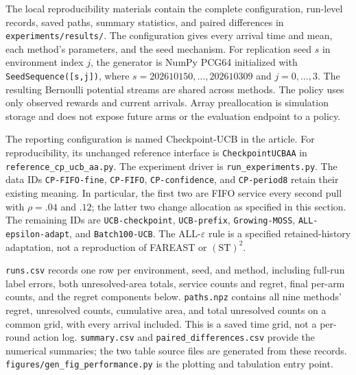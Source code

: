 \documentclass[11pt]{article}
\theoremstyle{remark}
\begin{document}
The local reproducibility materials contain the complete configuration,
run-level records, saved paths, summary statistics, and paired differences
in \texttt{experiments/results/}. The configuration gives every arrival
time and mean, each method's parameters, and the seed mechanism. For
replication seed $s$ in environment index $j$, the generator is NumPy
PCG64 initialized with \texttt{SeedSequence([s,j])}, where
$s=202610150,\ldots,202610309$ and $j=0,\ldots,3$.
The resulting Bernoulli potential streams are shared across methods.
The policy uses only observed rewards and current arrivals. Array
preallocation is simulation storage and does not expose future arms or
the evaluation endpoint to a policy.

The reporting configuration is named Checkpoint-UCB in the article.
For reproducibility, its unchanged reference interface is
\texttt{CheckpointUCBAA} in \texttt{reference\_cp\_ucb\_aa.py}.
The experiment driver is \texttt{run\_experiments.py}.
The data IDs \texttt{CP-FIFO-fine}, \texttt{CP-FIFO},
\texttt{CP-confidence}, and \texttt{CP-period8} retain their existing
meaning. In particular, the first two are FIFO service every second pull
with $\rho=.04$ and $.12$; the latter two change allocation as specified
in this section. The remaining IDs are \texttt{UCB-checkpoint},
\texttt{UCB-prefix}, \texttt{Growing-MOSS},
\texttt{ALL-epsilon-adapt}, and \texttt{Batch100-UCB}.
The ALL-$\varepsilon$ rule is a specified retained-history adaptation,
not a reproduction of FAREAST or $(\mathrm{ST})^2$.

\texttt{runs.csv} records one row per environment, seed, and method,
including full-run label errors, both unresolved-area totals, service
counts and regret, final per-arm counts, and the regret components below.
\texttt{paths.npz} contains all nine methods' regret, unresolved counts,
cumulative area, and total unresolved counts on a common grid, with
every arrival included. This is a saved time grid, not a per-round action
log. \texttt{summary.csv} and \texttt{paired\_differences.csv} provide
the numerical summaries; the two table source files are generated from
these records. \texttt{figures/gen\_fig\_performance.py} is the plotting
and tabulation entry point.
\end{document}
